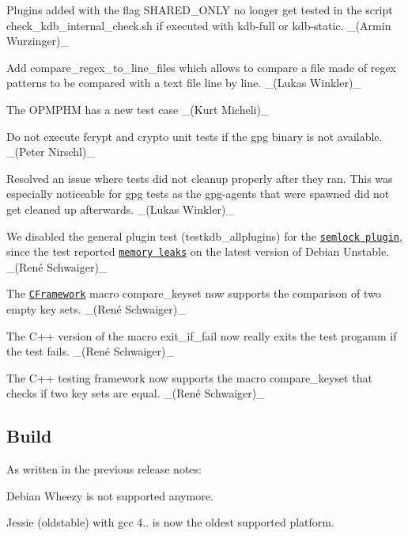 \begin{DoxyItemize}
\item Plugins added with the flag {\ttfamily S\+H\+A\+R\+E\+D\+\_\+\+O\+N\+LY} no longer get tested in the script {\ttfamily check\+\_\+kdb\+\_\+internal\+\_\+check.\+sh} if executed with kdb-\/full or kdb-\/static. \+\_\+(\+Armin Wurzinger)\+\_\+
\item Add {\ttfamily compare\+\_\+regex\+\_\+to\+\_\+line\+\_\+files} which allows to compare a file made of regex patterns to be compared with a text file line by line. \+\_\+(\+Lukas Winkler)\+\_\+
\item The O\+P\+M\+P\+HM has a new test case \+\_\+(\+Kurt Micheli)\+\_\+
\item Do not execute {\ttfamily fcrypt} and {\ttfamily crypto} unit tests if the {\ttfamily gpg} binary is not available. \+\_\+(\+Peter Nirschl)\+\_\+
\item Resolved an issue where tests did not cleanup properly after they ran. This was especially noticeable for {\ttfamily gpg} tests as the {\ttfamily gpg-\/agents} that were spawned did not get cleaned up afterwards. \+\_\+(\+Lukas Winkler)\+\_\+
\item We disabled the general plugin test ({\ttfamily testkdb\+\_\+allplugins}) for the \href{https://libelektra.org/plugins/mini}{\tt {\ttfamily semlock} plugin}, since the test reported \href{https://issues.libelektra.org/2113}{\tt memory leaks} on the latest version of Debian Unstable. \+\_\+(René Schwaiger)\+\_\+
\item The \href{https://master.libelektra.org/tests/cframework}{\tt C\+Framework} macro {\ttfamily compare\+\_\+keyset} now supports the comparison of two empty key sets. \+\_\+(René Schwaiger)\+\_\+
\item The C++ version of the macro {\ttfamily exit\+\_\+if\+\_\+fail} now really exits the test progamm if the test fails. \+\_\+(René Schwaiger)\+\_\+
\item The C++ testing framework now supports the macro {\ttfamily compare\+\_\+keyset} that checks if two key sets are equal. \+\_\+(René Schwaiger)\+\_\+
\end{DoxyItemize}

\subsection*{Build}

As written in the previous release notes\+:


\begin{DoxyItemize}
\item Debian Wheezy is not supported anymore.
\item Jessie (oldstable) with gcc 4.. is now the oldest supported platform.
\end{DoxyItemize}

